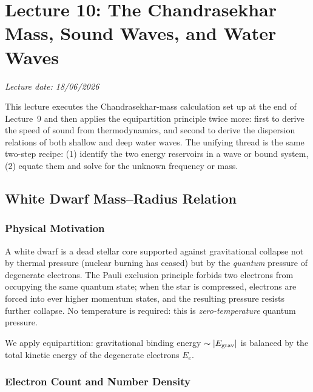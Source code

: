 \section{Lecture 10: The Chandrasekhar Mass, Sound Waves, and Water Waves}
\label{sec:lec10}
\date{18/06/2026}

\begin{center}
    \textit{Lecture date: 18/06/2026}
\end{center}

This lecture executes the Chandrasekhar-mass calculation set up at the end of
Lecture~9 and then applies the equipartition principle twice more: first to
derive the speed of sound from thermodynamics, and second to derive the
dispersion relations of both shallow and deep water waves. The unifying thread
is the same two-step recipe: (1) identify the two energy reservoirs in a wave or
bound system, (2) equate them and solve for the unknown frequency or mass.

\subsection{White Dwarf Mass--Radius Relation}
\label{sec:lec10:wd-setup}

\subsubsection*{Physical Motivation}
A white dwarf is a dead stellar core supported against gravitational collapse
not by thermal pressure (nuclear burning has ceased) but by the \emph{quantum}
pressure of degenerate electrons. The Pauli exclusion principle forbids two
electrons from occupying the same quantum state; when the star is compressed,
electrons are forced into ever higher momentum states, and the resulting
pressure resists further collapse. No temperature is required: this is
\emph{zero-temperature} quantum pressure.

We apply equipartition: gravitational binding energy $\sim |E_{\rm grav}|$ is
balanced by the total kinetic energy of the degenerate electrons $E_e$.

\subsubsection*{Electron Count and Number Density}

